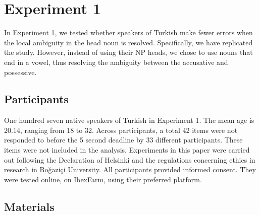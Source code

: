 \documentclass[doc,a4paper,man,natbib,floatsintext,noextraspace]{apa6}\usepackage[]{graphicx}\usepackage[]{color}
\begin{document}
\section{Experiment 1} \label{sec:exp1}



In Experiment 1, we tested whether speakers of Turkish make fewer errors when the local ambiguity in the head noun is resolved. Specifically, we have replicated the \citet{LagoEtAl:2018} study. However, instead of using their NP heads, we chose to use nouns that end in a vowel, thus resolving the ambiguity between the accusative and possessive. 

\subsection{Participants} \label{sec:exp1:participants}

One hundred seven native speakers of Turkish in Experiment 1. The mean age is 20.14, ranging from 18 to 32. Across participants, a total 42 items were not responded to before the 5 second deadline by 33 different participants. These items were not included in the analysis. Experiments in this paper were carried out following the Declaration of Helsinki and the regulations concerning ethics in research in Bo\u{g}azi\c{c}i University. All participants provided informed consent. They were tested online, on IbexFarm, using their preferred platform. 

\subsection{Materials} \label{sec:exp1:materials}
\end{document}
